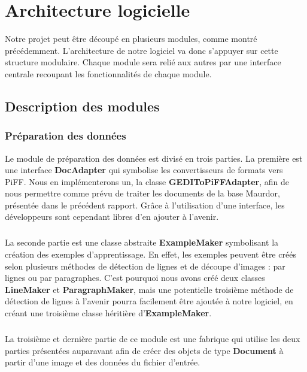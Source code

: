 \chapter{Architecture logicielle}

Notre projet peut être découpé en plusieurs modules, comme montré précédemment.
L’architecture de notre logiciel va donc s’appuyer sur cette structure
modulaire. Chaque module sera relié aux autres par une interface centrale
recoupant les fonctionnalités de chaque module.

\section{Description des modules}

\subsection{Préparation des données}

Le module de préparation des données est divisé en trois parties. La première
est une interface \textbf{DocAdapter} qui symbolise les convertisseurs de
formats vers PiFF. Nous en implémenterons un, la classe
\textbf{GEDIToPiFFAdapter}, afin de nous permettre comme prévu de traiter les
documents de la base Maurdor, présentée dans le précédent rapport. Grâce à
l’utilisation d’une interface, les développeurs sont cependant libres d’en
ajouter à l’avenir.

\paragraph{}
La seconde partie est une classe abstraite \textbf{ExampleMaker} symbolisant la
création des exemples d’apprentissage. En effet, les exemples peuvent être créés
selon plusieurs méthodes de détection de lignes et de découpe d’images : par
lignes ou par paragraphes. C’est pourquoi nous avons créé deux classes
\textbf{LineMaker} et \textbf{ParagraphMaker}, mais une potentielle troisième
méthode de détection de lignes à l’avenir pourra facilement être ajoutée à notre
logiciel, en créant une troisième classe héritière d’\textbf{ExampleMaker}.

\paragraph{}
La troisième et dernière partie de ce module est une fabrique qui utilise les
deux parties présentées auparavant afin de créer des objets de type
\textbf{Document} à partir d’une image et des données du fichier d’entrée.

